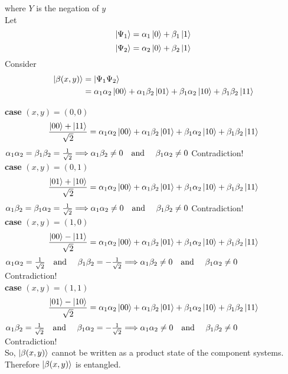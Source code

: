 \documentclass[12pt, a4paper]{article}
\begin{document}
\begin{enumerate}
where $Y$ is the negation of $y$\\
Let 
$$\ket{\Psi_1} = \alpha_1\ket{0} + \beta_1\ket{1}$$
$$\ket{\Psi_2} = \alpha_2\ket{0} + \beta_2\ket{1}$$
Consider
\begin{align*}
		\ket{\beta(x, y)} &=\ket{\Psi_1\Psi_2}\\
		&=\alpha_1\alpha_2\ket{00} + \alpha_1\beta_2\ket{01} + \beta_1\alpha_2\ket{10} + \beta_1\beta_2\ket{11}
\end{align*}

\textbf{case} $(x, y) = (0, 0)$
$$\frac{\ket{00} + \ket{11}}{\sqrt{2}} = \alpha_1\alpha_2\ket{00} + \alpha_1\beta_2\ket{01} + \beta_1\alpha_2\ket{10} + \beta_1\beta_2\ket{11}$$
$\alpha_1\alpha_2 = \beta_1\beta_2  = \frac{1}{\sqrt{2}} \Longrightarrow \alpha_1\beta_2 \not = 0 \text{\quad and \quad} \beta_1\alpha_2 \not = 0$
Contradiction!\\

\textbf{case} $(x, y) = (0, 1)$
$$\frac{\ket{01} + \ket{10}}{\sqrt{2}} = \alpha_1\alpha_2\ket{00} + \alpha_1\beta_2\ket{01} + \beta_1\alpha_2\ket{10} + \beta_1\beta_2\ket{11}$$
$\alpha_1\beta_2 = \beta_1\alpha_2  = \frac{1}{\sqrt{2}} \Longrightarrow \alpha_1\alpha_2 \not = 0 \text{\quad and \quad} \beta_1\beta_2 \not = 0$
Contradiction!\\

\textbf{case} $(x, y) = (1, 0)$
$$\frac{\ket{00} - \ket{11}}{\sqrt{2}} = \alpha_1\alpha_2\ket{00} + \alpha_1\beta_2\ket{01} + \beta_1\alpha_2\ket{10} + \beta_1\beta_2\ket{11}$$
$\alpha_1\alpha_2 =  \frac{1}{\sqrt{2}} \text{\quad and \quad} \beta_1\beta_2  =- \frac{1}{\sqrt{2}} \Longrightarrow \alpha_1\beta_2 \not = 0 \text{\quad and \quad} \beta_1\alpha_2 \not = 0$\\
Contradiction!\\

\textbf{case} $(x, y) = (1, 1)$
$$\frac{\ket{01} - \ket{10}}{\sqrt{2}} = \alpha_1\alpha_2\ket{00} + \alpha_1\beta_2\ket{01} + \beta_1\alpha_2\ket{10} + \beta_1\beta_2\ket{11}$$
$\alpha_1\beta_2 = \frac{1}{\sqrt{2}} \text{\quad and \quad}  \beta_1\alpha_2  = -\frac{1}{\sqrt{2}} \Longrightarrow \alpha_1\alpha_2 \not = 0 \text{\quad and \quad} \beta_1\beta_2 \not = 0$\\
Contradiction!\\

So, $\ket{\beta(x, y)}$ cannot be written as a product state of the component systems.
Therefore $\ket{\beta(x, y)}$ is entangled.
\end{enumerate}
\end{document}
